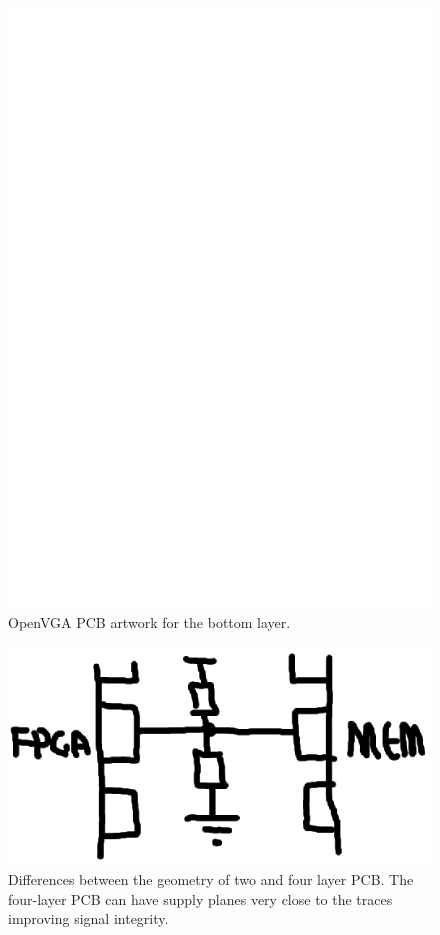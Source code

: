 \begin{figure}
\begin{center}
\includegraphics[width=\linewidth]{images/freega3_pcb_art_bot.eps}
\caption[OpenVGA PCB Artwork Bottom Layer]{OpenVGA PCB artwork for the bottom
layer.}
\end{center}
\end{figure}


\begin{figure}
\begin{center}
\includegraphics[width=\linewidth]{images/async_fifo.eps}
\caption[Differences between the geometry of two and four -layer
PCB]{Differences between the geometry of two and four layer
PCB. The four-layer PCB can have supply planes very close to the traces
improving signal integrity.}
\label{HARD_PCB_Comp}
\end{center}
\end{figure}


